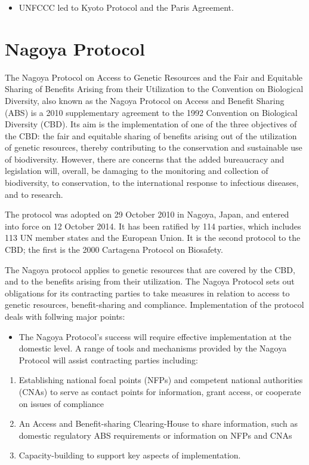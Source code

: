 \documentclass[
  openany]{book}
\providecommand{\tightlist}{%
  \setlength{\itemsep}{0pt}\setlength{\parskip}{0pt}}
\begin{document}
\begin{itemize}
\tightlist
\item
  UNFCCC led to Kyoto Protocol and the Paris Agreement.
\end{itemize}

\hypertarget{nagoya-protocol}{%
\section{Nagoya Protocol}\label{nagoya-protocol}}

The Nagoya Protocol on Access to Genetic Resources and the Fair and Equitable Sharing of Benefits Arising from their Utilization to the Convention on Biological Diversity, also known as the Nagoya Protocol on Access and Benefit Sharing (ABS) is a 2010 supplementary agreement to the 1992 Convention on Biological Diversity (CBD). Its aim is the implementation of one of the three objectives of the CBD: the fair and equitable sharing of benefits arising out of the utilization of genetic resources, thereby contributing to the conservation and sustainable use of biodiversity. However, there are concerns that the added bureaucracy and legislation will, overall, be damaging to the monitoring and collection of biodiversity, to conservation, to the international response to infectious diseases, and to research.

The protocol was adopted on 29 October 2010 in Nagoya, Japan, and entered into force on 12 October 2014. It has been ratified by 114 parties, which includes 113 UN member states and the European Union. It is the second protocol to the CBD; the first is the 2000 Cartagena Protocol on Biosafety.

The Nagoya protocol applies to genetic resources that are covered by the CBD, and to the benefits arising from their utilization. The Nagoya Protocol sets out obligations for its contracting parties to take measures in relation to access to genetic resources, benefit-sharing and compliance. Implementation of the protocol deals with follwing major points:

\begin{itemize}
\tightlist
\item
  The Nagoya Protocol's success will require effective implementation at the domestic level. A range of tools and mechanisms provided by the Nagoya Protocol will assist contracting parties including:
\end{itemize}

\begin{enumerate}
\def\labelenumi{\arabic{enumi}.}
\tightlist
\item
  Establishing national focal points (NFPs) and competent national authorities (CNAs) to serve as contact points for information, grant access, or cooperate on issues of compliance
\item
  An Access and Benefit-sharing Clearing-House to share information, such as domestic regulatory ABS requirements or information on NFPs and CNAs
\item
  Capacity-building to support key aspects of implementation.
\end{enumerate}
\end{document}

